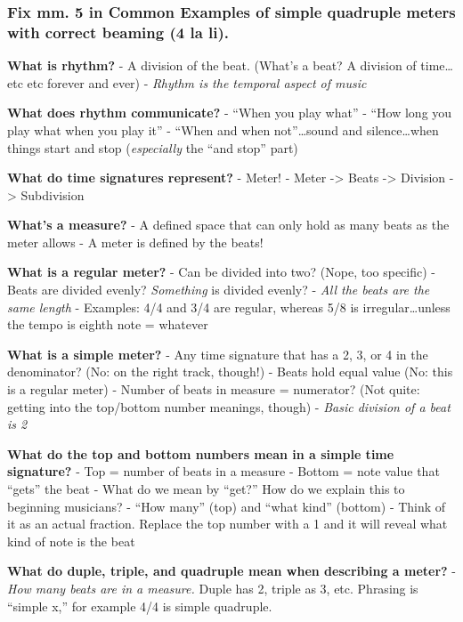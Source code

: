\documentclass{book}
\begin{document}
\hypertarget{fix-mm.-5-in-common-examples-of-simple-quadruple-meters-with-correct-beaming-4-la-li.}{%
\subsubsection{Fix mm. 5 in Common Examples of simple quadruple meters with
correct beaming (4 la
li).}\label{fix-mm.-5-in-common-examples-of-simple-quadruple-meters-with-correct-beaming-4-la-li.}}

\textbf{What is rhythm?} - A division of the beat. (What's a beat? A division
of time\ldots etc etc forever and ever) - \emph{Rhythm is the temporal aspect
of music}

\textbf{What does rhythm communicate?} - ``When you play what'' - ``How long
you play what when you play it'' - ``When and when not''\ldots sound and
silence\ldots when things start and stop (\emph{especially} the ``and stop''
part)

\textbf{What do time signatures represent?} - Meter! - Meter -\textgreater{}
Beats -\textgreater{} Division -\textgreater{} Subdivision

\textbf{What's a measure?} - A defined space that can only hold as many beats
as the meter allows - A meter is defined by the beats!

\textbf{What is a regular meter?} - Can be divided into two? (Nope, too
specific) - Beats are divided evenly? \emph{Something} is divided evenly? -
\emph{All the beats are the same length} - Examples: 4/4 and 3/4 are regular,
whereas 5/8 is irregular\ldots unless the tempo is eighth note = whatever

\textbf{What is a simple meter?} - Any time signature that has a 2, 3, or 4 in
the denominator? (No: on the right track, though!) - Beats hold equal value
(No: this is a regular meter) - Number of beats in measure = numerator? (Not
quite: getting into the top/bottom number meanings, though) - \emph{Basic
division of a beat is 2}

\textbf{What do the top and bottom numbers mean in a simple time signature?} -
Top = number of beats in a measure - Bottom = note value that ``gets'' the
beat - What do we mean by ``get?'' How do we explain this to beginning
musicians? - ``How many'' (top) and ``what kind'' (bottom) - Think of it as an
actual fraction. Replace the top number with a 1 and it will reveal what kind
of note is the beat

\textbf{What do duple, triple, and quadruple mean when describing a meter?} -
\emph{How many beats are in a measure.} Duple has 2, triple as 3, etc.
Phrasing is ``simple x,'' for example 4/4 is simple quadruple.
\end{document}
